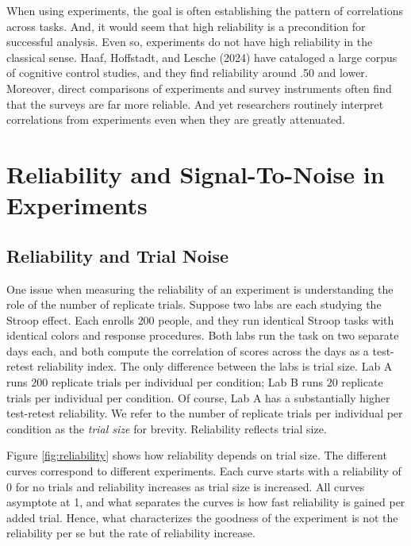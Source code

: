\documentclass[
  ,man]{apa6}
\begin{document}
When using experiments, the goal is often establishing the pattern of correlations across tasks. And, it would seem that high reliability is a precondition for successful analysis. Even so, experiments do not have high reliability in the classical sense. Haaf, Hoffstadt, and Lesche (2024) have cataloged a large corpus of cognitive control studies, and they find reliability around .50 and lower. Moreover, direct comparisons of experiments and survey instruments often find that the surveys are far more reliable. And yet researchers routinely interpret correlations from experiments even when they are greatly attenuated.

\section{Reliability and Signal-To-Noise in Experiments}\label{reliability-and-signal-to-noise-in-experiments}

\subsection{Reliability and Trial Noise}\label{reliability-and-trial-noise}

One issue when measuring the reliability of an experiment is understanding the role of the number of replicate trials. Suppose two labs are each studying the Stroop effect. Each enrolls \(200\) people, and they run identical Stroop tasks with identical colors and response procedures. Both labs run the task on two separate days each, and both compute the correlation of scores across the days as a test-retest reliability index. The only difference between the labs is trial size. Lab A runs \(200\) replicate trials per individual per condition; Lab B runs \(20\) replicate trials per individual per condition. Of course, Lab A has a substantially higher test-retest reliability. We refer to the number of replicate trials per individual per condition as the \emph{trial size} for brevity. Reliability reflects trial size.

Figure \ref{fig:reliability} shows how reliability depends on trial size. The different curves correspond to different experiments. Each curve starts with a reliability of 0 for no trials and reliability increases as trial size is increased. All curves asymptote at 1, and what separates the curves is how fast reliability is gained per added trial. Hence, what characterizes the goodness of the experiment is not the reliability per se but the rate of reliability increase.
\end{document}
